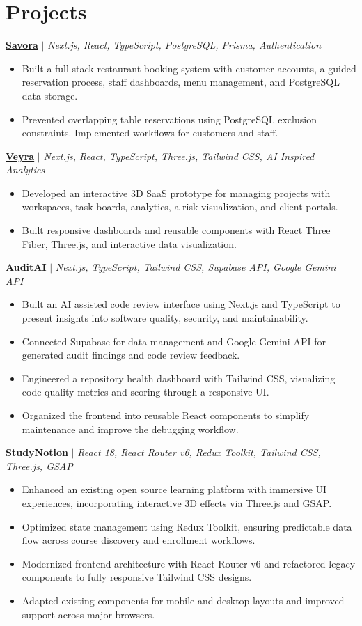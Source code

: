 \documentclass[letterpaper,10pt]{article}
\newcommand{\project}[3]{%
\needspace{135pt}%
\vspace{5pt}\hspace{10.8pt}\textbf{\href{#3}{#1}} $\mid$ \textit{#2}\par\vspace{-1pt}%
}
\newcommand{\resumeitem}[1]{\item #1}
\begin{document}
\section{Projects}
\project{Savora}{Next.js, React, TypeScript, PostgreSQL, Prisma, Authentication}{https://github.com/RAJ-SUHANDANI/Savora}
\begin{itemize}
\resumeitem{Built a full stack restaurant booking system with customer accounts, a guided reservation process, staff dashboards, menu management, and PostgreSQL data storage.}
\resumeitem{Prevented overlapping table reservations using PostgreSQL exclusion constraints. Implemented workflows for customers and staff.}
\end{itemize}
\project{Veyra}{Next.js, React, TypeScript, Three.js, Tailwind CSS, AI Inspired Analytics}{https://github.com/RAJ-SUHANDANI/Veyra}
\begin{itemize}
\resumeitem{Developed an interactive 3D SaaS prototype for managing projects with workspaces, task boards, analytics, a risk visualization, and client portals.}
\resumeitem{Built responsive dashboards and reusable components with React Three Fiber, Three.js, and interactive data visualization.}
\end{itemize}
\project{AuditAI}{Next.js, TypeScript, Tailwind CSS, Supabase API, Google Gemini API}{https://github.com/RAJ-SUHANDANI/AuditAI}
\begin{itemize}
\resumeitem{Built an AI assisted code review interface using Next.js and TypeScript to present insights into software quality, security, and maintainability.}
\resumeitem{Connected Supabase for data management and Google Gemini API for generated audit findings and code review feedback.}
\resumeitem{Engineered a repository health dashboard with Tailwind CSS, visualizing code quality metrics and scoring through a responsive UI.}
\resumeitem{Organized the frontend into reusable React components to simplify maintenance and improve the debugging workflow.}
\end{itemize}
\project{StudyNotion}{React 18, React Router v6, Redux Toolkit, Tailwind CSS, Three.js, GSAP}{https://github.com/RAJ-SUHANDANI/StudyNotion}
\begin{itemize}
\resumeitem{Enhanced an existing open source learning platform with immersive UI experiences, incorporating interactive 3D effects via Three.js and GSAP.}
\resumeitem{Optimized state management using Redux Toolkit, ensuring predictable data flow across course discovery and enrollment workflows.}
\resumeitem{Modernized frontend architecture with React Router v6 and refactored legacy components to fully responsive Tailwind CSS designs.}
\resumeitem{Adapted existing components for mobile and desktop layouts and improved support across major browsers.}
\end{itemize}
\end{document}
